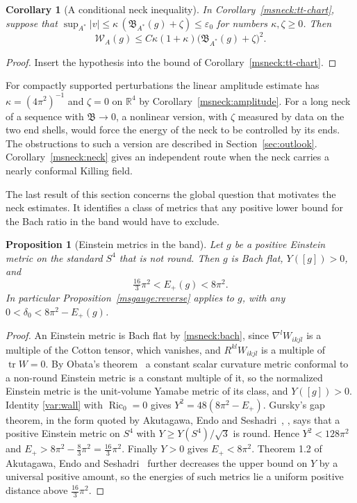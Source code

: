\documentclass[11pt]{article}
\numberwithin{equation}{section}
\newtheorem{proposition}[theorem]{Proposition}
\newtheorem{corollary}[theorem]{Corollary}
\theoremstyle{definition}
\theoremstyle{remark}
\DeclareMathOperator{\Ric}{Ric}
\DeclareMathOperator{\tr}{tr}
\begin{document}
\begin{corollary}[A conditional neck inequality]\label{msneck:conditional}
In Corollary~\ref{msneck:tt-chart}, suppose that
\(\sup_{A^*}|v|\le\kappa\,(\mathfrak B_{A^*}(g)+\zeta)\le\varepsilon_0\) for
numbers \(\kappa,\zeta\ge0\). Then
\[
 \mathcal W_A(g)\le C\kappa(1+\kappa)\bigl(\mathfrak B_{A^*}(g)+\zeta\bigr)^2 .
\]
\end{corollary}

\begin{proof}
Insert the hypothesis into the bound of Corollary~\ref{msneck:tt-chart}.
\end{proof}

For compactly supported perturbations the linear amplitude estimate has
\(\kappa=(4\pi^2)^{-1}\) and \(\zeta=0\) on \(\mathbb R^4\) by
Corollary~\ref{msneck:amplitude}.
For a long neck of a sequence with \(\mathfrak B\to0\), a nonlinear version,
with \(\zeta\) measured by data on the two end shells, would force the
energy of the neck to be controlled by its ends. The obstructions to
such a version are described in Section~\ref{sec:outlook}.
Corollary~\ref{msneck:neck} gives an independent route when the neck
carries a nearly conformal Killing field.

The last result of this section concerns the global question that
motivates the neck estimates. It identifies a class of metrics that any
positive lower bound for the Bach ratio in the band would have to
exclude.

\begin{proposition}[Einstein metrics in the band]\label{msneck:einstein}
Let \(g\) be a positive Einstein metric on the standard \(S^4\) that is
not round. Then \(g\) is Bach flat, \(Y([g])>0\), and
\[
 \tfrac{16}3\pi^2<E_+(g)<8\pi^2 .
\]
In particular Proposition~\ref{msgauge:reverse} applies to \(g\), with any
\(0<\delta_0<8\pi^2-E_+(g)\).
\end{proposition}

\begin{proof}
An Einstein metric is Bach flat by \eqref{msneck:bach}, since
\(\nabla^lW_{ikjl}\) is a multiple of the Cotton tensor, which vanishes,
and \(R^{kl}W_{ikjl}\) is a multiple of \(\tr W=0\). By Obata's
theorem~\cite{Obata1962Sphere} a constant scalar curvature metric
conformal to a non-round Einstein metric is a constant multiple of it,
so the normalized Einstein metric is the unit-volume Yamabe metric of its
class, and \(Y([g])>0\). Identity \eqref{var:wall} with \(\Ric_0=0\) gives
\(Y^2=48(8\pi^2-E_+)\). Gursky's gap theorem, in the form quoted by
Akutagawa, Endo and Seshadri~\cite[Theorem
1.1]{AkutagawaEndoSeshadri2019Gap}, \cite{Gursky2000EinsteinConstants},
says that a positive Einstein metric on \(S^4\) with
\(Y\ge Y(S^4)/\sqrt3\) is round. Hence \(Y^2<128\pi^2\) and
\(E_+>8\pi^2-\tfrac83\pi^2=\tfrac{16}3\pi^2\). Finally \(Y>0\) gives
\(E_+<8\pi^2\). Theorem 1.2 of Akutagawa, Endo and
Seshadri~\cite{AkutagawaEndoSeshadri2019Gap} further decreases the upper
bound on \(Y\) by a universal positive amount, so the energies of
such metrics lie a uniform positive distance above
\(\tfrac{16}3\pi^2\).
\end{proof}
\end{document}
